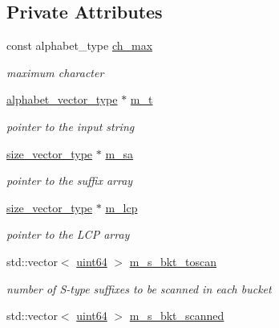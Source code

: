 \subsection*{Private Attributes}
\begin{DoxyCompactItemize}
\item 
const alphabet\+\_\+type \hyperlink{struct_validate4_1_1_l_scan_a907234b2fa774b42e87050f0066e26b6}{ch\+\_\+max}
\begin{DoxyCompactList}\small\item\em maximum character \end{DoxyCompactList}\item 
\hyperlink{class_validate4_a49c80b3d101be19542a4341c2387603a}{alphabet\+\_\+vector\+\_\+type} $\ast$ \hyperlink{struct_validate4_1_1_l_scan_a3f7a5fe6e603159503a161185eb38667}{m\+\_\+t}
\begin{DoxyCompactList}\small\item\em pointer to the input string \end{DoxyCompactList}\item 
\hyperlink{class_validate4_a46ea31a0a4b23f583806792160421d15}{size\+\_\+vector\+\_\+type} $\ast$ \hyperlink{struct_validate4_1_1_l_scan_a38f7644fb0e19bc24c83cbcc04f1b01f}{m\+\_\+sa}
\begin{DoxyCompactList}\small\item\em pointer to the suffix array \end{DoxyCompactList}\item 
\hyperlink{class_validate4_a46ea31a0a4b23f583806792160421d15}{size\+\_\+vector\+\_\+type} $\ast$ \hyperlink{struct_validate4_1_1_l_scan_af9ba74080cb7b3e0f685d29a4c78ab73}{m\+\_\+lcp}
\begin{DoxyCompactList}\small\item\em pointer to the L\+CP array \end{DoxyCompactList}\item 
std\+::vector$<$ \hyperlink{types_8h_a60e8696a4678cd348e991a1f172e53f7}{uint64} $>$ \hyperlink{struct_validate4_1_1_l_scan_ad072911a65100e41a34b17ee6dc79cd4}{m\+\_\+s\+\_\+bkt\+\_\+toscan}
\begin{DoxyCompactList}\small\item\em number of S-\/type suffixes to be scanned in each bucket \end{DoxyCompactList}\item 
std\+::vector$<$ \hyperlink{types_8h_a60e8696a4678cd348e991a1f172e53f7}{uint64} $>$ \hyperlink{struct_validate4_1_1_l_scan_a66ce5f59bcd37d47371f847769297b46}{m\+\_\+s\+\_\+bkt\+\_\+scanned}

\end{DoxyCompactItemize}
